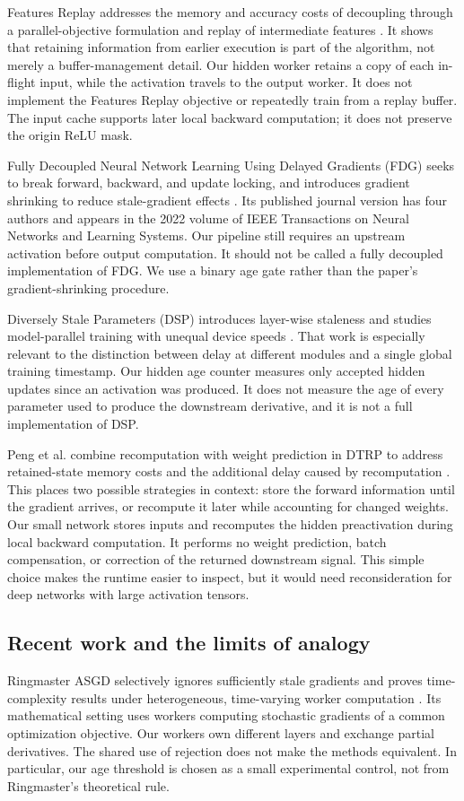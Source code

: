 \documentclass[conference]{IEEEtran}
\begin{document}
Features Replay addresses the memory and accuracy costs of decoupling through a parallel-objective formulation and replay of intermediate features \cite{replay}. It shows that retaining information from earlier execution is part of the algorithm, not merely a buffer-management detail. Our hidden worker retains a copy of each in-flight input, while the activation travels to the output worker. It does not implement the Features Replay objective or repeatedly train from a replay buffer. The input cache supports later local backward computation; it does not preserve the origin ReLU mask.

Fully Decoupled Neural Network Learning Using Delayed Gradients (FDG) seeks to break forward, backward, and update locking, and introduces gradient shrinking to reduce stale-gradient effects \cite{fdg}. Its published journal version has four authors and appears in the 2022 volume of IEEE Transactions on Neural Networks and Learning Systems. Our pipeline still requires an upstream activation before output computation. It should not be called a fully decoupled implementation of FDG. We use a binary age gate rather than the paper's gradient-shrinking procedure.

Diversely Stale Parameters (DSP) introduces layer-wise staleness and studies model-parallel training with unequal device speeds \cite{dsp}. That work is especially relevant to the distinction between delay at different modules and a single global training timestamp. Our hidden age counter measures only accepted hidden updates since an activation was produced. It does not measure the age of every parameter used to produce the downstream derivative, and it is not a full implementation of DSP.

Peng et al. combine recomputation with weight prediction in DTRP to address retained-state memory costs and the additional delay caused by recomputation \cite{dtrp}. This places two possible strategies in context: store the forward information until the gradient arrives, or recompute it later while accounting for changed weights. Our small network stores inputs and recomputes the hidden preactivation during local backward computation. It performs no weight prediction, batch compensation, or correction of the returned downstream signal. This simple choice makes the runtime easier to inspect, but it would need reconsideration for deep networks with large activation tensors.

\subsection{Recent work and the limits of analogy}
Ringmaster ASGD selectively ignores sufficiently stale gradients and proves time-complexity results under heterogeneous, time-varying worker computation \cite{ringmaster}. Its mathematical setting uses workers computing stochastic gradients of a common optimization objective. Our workers own different layers and exchange partial derivatives. The shared use of rejection does not make the methods equivalent. In particular, our age threshold is chosen as a small experimental control, not from Ringmaster's theoretical rule.
\end{document}
